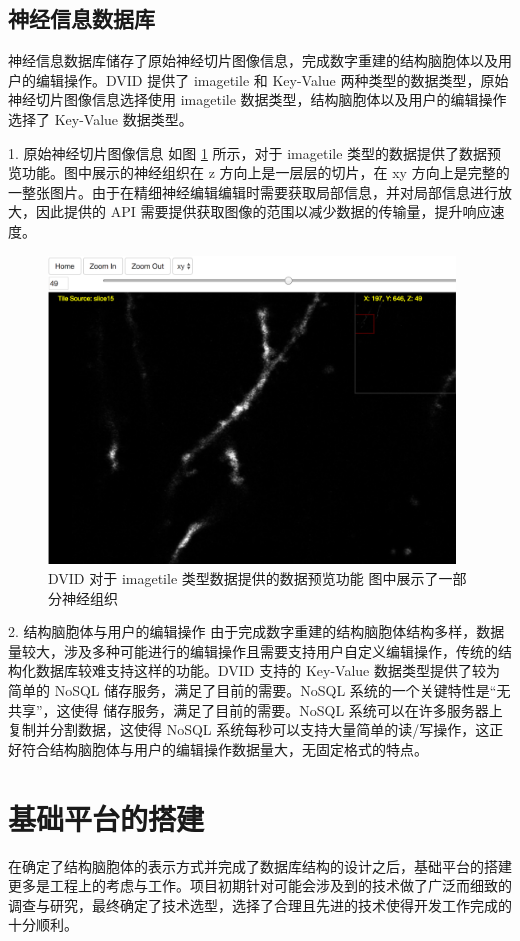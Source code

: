 \subsection{神经信息数据库}
神经信息数据库储存了原始神经切片图像信息，完成数字重建的结构脑胞体以及用户的编辑操作。DVID 提供了 imagetile 和 Key-Value 两种类型的数据类型，原始神经切片图像信息选择使用 imagetile 数据类型，结构脑胞体以及用户的编辑操作选择了 Key-Value 数据类型。

1. 原始神经切片图像信息
如图 \ref{dvid} 所示，对于 imagetile 类型的数据提供了数据预览功能。图中展示的神经组织在 z 方向上是一层层的切片，在 xy 方向上是完整的一整张图片。由于在精细神经编辑编辑时需要获取局部信息，并对局部信息进行放大，因此提供的 API 需要提供获取图像的范围以减少数据的传输量，提升响应速度。

\begin{figure}[!ht]
\centering
\includegraphics[width=108mm]{images/dvid}
\caption{DVID 对于 imagetile 类型数据提供的数据预览功能 图中展示了一部分神经组织}
\label{dvid}
\end{figure}

2. 结构脑胞体与用户的编辑操作
由于完成数字重建的结构脑胞体结构多样，数据量较大，涉及多种可能进行的编辑操作且需要支持用户自定义编辑操作，传统的结构化数据库较难支持这样的功能。DVID 支持的 Key-Value 数据类型提供了较为简单的 NoSQL 储存服务，满足了目前的需要。NoSQL 系统的一个关键特性是“无共享”，这使得 储存服务，满足了目前的需要。NoSQL 系统可以在许多服务器上复制并分割数据，这使得 NoSQL 系统每秒可以支持大量简单的读/写操作，这正好符合结构脑胞体与用户的编辑操作数据量大，无固定格式的特点。

\section{基础平台的搭建}
在确定了结构脑胞体的表示方式并完成了数据库结构的设计之后，基础平台的搭建更多是工程上的考虑与工作。项目初期针对可能会涉及到的技术做了广泛而细致的调查与研究，最终确定了技术选型，选择了合理且先进的技术使得开发工作完成的十分顺利。

